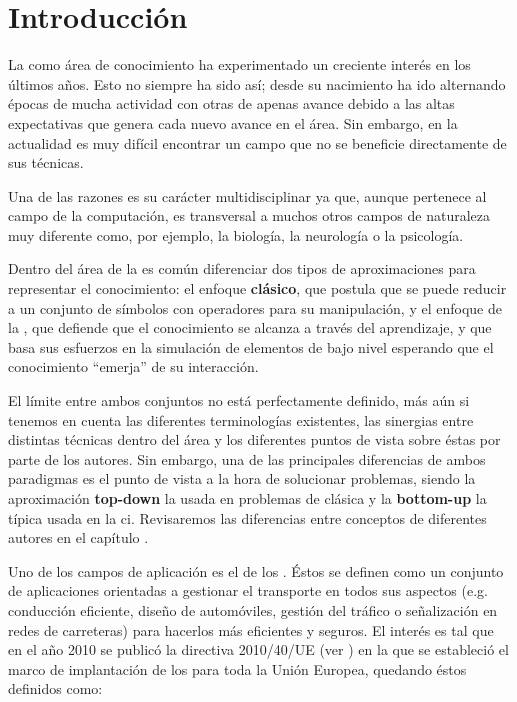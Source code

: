 \chapter{Introducción}
\label{ch:intro}

La  como área de conocimiento ha experimentado un creciente interés en los últimos años. Esto no siempre ha sido así; desde su nacimiento ha ido alternando épocas de mucha actividad con otras de apenas avance debido a las altas expectativas que genera cada nuevo avance en el área. Sin embargo, en la actualidad es muy difícil encontrar un campo que no se beneficie directamente de sus técnicas.

Una de las razones es su carácter multidisciplinar ya que, aunque pertenece al campo de la computación, es transversal a muchos otros campos de naturaleza muy diferente como, por ejemplo, la biología, la neurología o la psicología.

Dentro del área de la  es común diferenciar dos tipos de aproximaciones para representar el conocimiento: el enfoque \textbf{clásico}, que postula que se puede reducir a un conjunto de símbolos con operadores para su manipulación, y el enfoque de la , que defiende que el conocimiento se alcanza a través del aprendizaje, y que basa sus esfuerzos en la simulación de elementos de bajo nivel esperando que el conocimiento \enquote{emerja} de su interacción.

El límite entre ambos conjuntos no está perfectamente definido, más aún si tenemos en cuenta las diferentes terminologías existentes, las sinergias entre distintas técnicas dentro del área y los diferentes puntos de vista sobre éstas por parte de los autores. Sin embargo, una de las principales diferencias de ambos paradigmas es el punto de vista a la hora de solucionar problemas, siendo la aproximación \textbf{top-down} la usada en problemas de  clásica y la \textbf{bottom-up} la típica usada en la \acrshort{ci}. Revisaremos las diferencias entre conceptos de diferentes autores en el capítulo .

Uno de los campos de aplicación es el de los . Éstos se definen como un conjunto de aplicaciones orientadas a gestionar el transporte en todos sus aspectos (e.g. conducción eficiente, diseño de automóviles, gestión del tráfico o señalización en redes de carreteras) para hacerlos más eficientes y seguros. El interés es tal que en el año 2010 se publicó la directiva 2010/40/UE (ver \cite{parliament2010directive}) en la que se estableció el marco de implantación de los  para toda la Unión Europea, quedando éstos definidos como:

